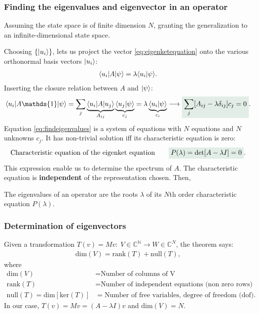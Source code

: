 \subsubsection{Finding the eigenvalues and eigenvector in an operator}
Assuming the state space is of finite dimension $N$, granting the generalization to an infinite-dimensional state space.

Choosing $\{|u_i\rangle\}$, lets us project the vector \eqref{eq:eigenketequation} onto the various orthonormal basis vectors $|u_i\rangle$:
\begin{align}
    \langle u_i|A|\psi\rangle=\lambda\langle u_i|\psi\rangle.
\end{align}
Inserting the closure relation between $A$ and $|\psi\rangle$:
\begin{align}
    \braket{u_i|A\mathds{1}|\psi}=\sum_j\underbrace{\braket{u_i|A|u_j}}_{A_{ij}}\underbrace{\braket{u_j|\psi}}_{c_j}=\lambda\underbrace{\braket{u_i|\psi}}_{c_i}
    \longrightarrow\highlight{\sum_j[A_{ij}-\lambda\delta_{ij}]c_j=0}.
    \label{eq:findeigenvalues}
\end{align}
Equation \eqref{eq:findeigenvalues} is a system of equations with $N$ equations and $N$ unknowns $c_j$. It has non-trivial solution iff its characteristic equation is zero:
\begin{align}
    \text{Characteristic equation of the eigenket equation}\qquad\highlight{P(\lambda)=\det[A-\lambda I]=0}.
\end{align}
This expression enable us to determine the spectrum of $A$. The characteristic equation is \textbf{independent} of the representation chosen. Then,
\begin{emphasizer}
    The eigenvalues of an operator are the roots $\lambda$ of its $N$th order characteristic equation $P(\lambda)$.
\end{emphasizer}

\subsubsection{Determination of eigenvectors}
Given a transformation $T(v)=Mv:\;V\in\mathbb{C^N}\longrightarrow W\in\mathbb{C}^N$, the theorem says:
\begin{align}
    \text{dim}(V)=\text{rank}(T)+\text{null}(T),
\end{align}
where
\begin{align*}
    \text{dim}(V)&=\text{Number of columns of V}\\
    \text{rank}(T)&=\text{Number of independent equations (non zero rows)}\\
    \text{null}(T)=\text{dim}[\text{ker}(T)]&=\text{Number of free variables, degree of freedom (dof)}.
\end{align*}
In our case, $T(v)=Mv=(A-\lambda I)v$ and $\text{dim}(V)=N$.


